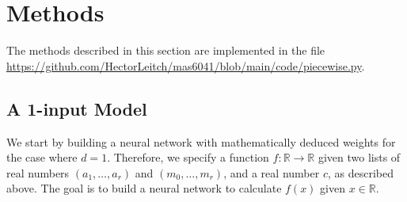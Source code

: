 \documentclass{somasmsc}
\begin{document}
\section{Methods}

The methods described in this section are implemented in the file \url{https://github.com/HectorLeitch/mas6041/blob/main/code/piecewise.py}.

\subsection{A 1-input Model}\label{piece:1d}

We start by building a neural network with mathematically deduced weights for the case where $d=1$. Therefore, we specify a function $f: \mathbb{R} \rightarrow \mathbb{R}$ given two lists of real numbers $\left(a_1, \dots, a_r\right)$ and $\left(m_0, \dots, m_r\right)$, and a real number $c$, as described above. The goal is to build a neural network to calculate $f(x)$ given $x \in \mathbb{R}$.
\end{document}
